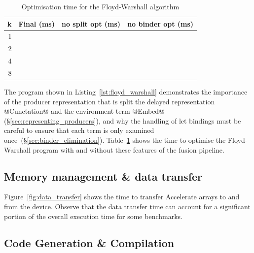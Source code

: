 \begin{table}
    \centering
    \begin{tabular}{rrrr}
\textbf{k}
    & \multicolumn{1}{c}{Final (ms)}
    & \multicolumn{1}{c}{no split opt (ms)}
    & \multicolumn{1}{c}{no binder opt (ms)}
    \\
    \hline

1   &
    &
    &
    \\

2   &
    &
    &
    \\

4   &
    &
    &
    \\

8   &
    &
    &
    \\

    \end{tabular}
    \caption{Optimisation time for the Floyd-Warshall algorithm}
    \label{tab:floyd_warshal_opt}
\end{table}

The program shown in Listing~\ref{lst:floyd_warshall} demonstrates the
importance of the producer representation that is split the delayed
representation @Cunctation@ and the environment term @Embed@
(\S\ref{sec:representing_producers}), and why the handling of let bindings must
be careful to ensure that each term is only examined
once~(\S\ref{sec:binder_elimination}). Table~\ref{tab:floyd_warshal_opt} shows
the time to optimise the Floyd-Warshall program with and without these features
of the fusion pipeline.


\subsection{Memory management \& data transfer}

Figure~\ref{fig:data_transfer} shows the time to transfer Accelerate arrays to
and from the device. Observe that the data transfer time can account for a
significant portion of the overall execution time for some benchmarks.


\subsection{Code Generation \& Compilation}

